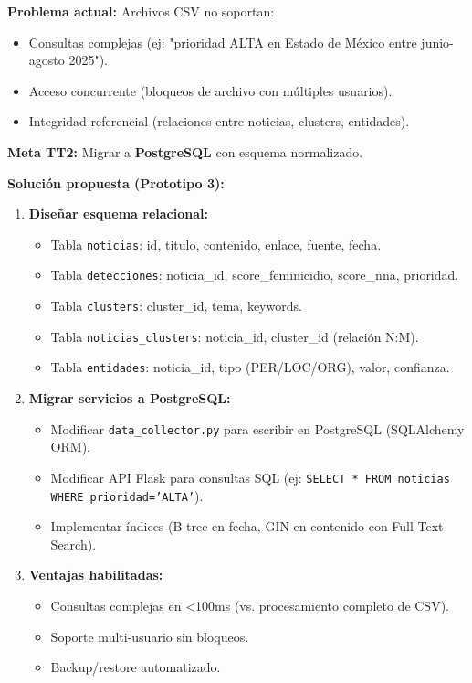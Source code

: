 \textbf{Problema actual:} Archivos CSV no soportan:
\begin{itemize}
    \item Consultas complejas (ej: "prioridad ALTA en Estado de México entre junio-agosto 2025").
    \item Acceso concurrente (bloqueos de archivo con múltiples usuarios).
    \item Integridad referencial (relaciones entre noticias, clusters, entidades).
\end{itemize}

\textbf{Meta TT2:} Migrar a \textbf{PostgreSQL} con esquema normalizado.

\textbf{Solución propuesta (Prototipo 3):}
\begin{enumerate}
    \item \textbf{Diseñar esquema relacional:}
    \begin{itemize}
        \item Tabla \texttt{noticias}: id, titulo, contenido, enlace, fuente, fecha.
        \item Tabla \texttt{detecciones}: noticia\_id, score\_feminicidio, score\_nna, prioridad.
        \item Tabla \texttt{clusters}: cluster\_id, tema, keywords.
        \item Tabla \texttt{noticias\_clusters}: noticia\_id, cluster\_id (relación N:M).
        \item Tabla \texttt{entidades}: noticia\_id, tipo (PER/LOC/ORG), valor, confianza.
    \end{itemize}
    
    \item \textbf{Migrar servicios a PostgreSQL:}
    \begin{itemize}
        \item Modificar \texttt{data\_collector.py} para escribir en PostgreSQL (SQLAlchemy ORM).
        \item Modificar API Flask para consultas SQL (ej: \texttt{SELECT * FROM noticias WHERE prioridad='ALTA'}).
        \item Implementar índices (B-tree en fecha, GIN en contenido con Full-Text Search).
    \end{itemize}
    
    \item \textbf{Ventajas habilitadas:}
    \begin{itemize}
        \item Consultas complejas en <100ms (vs. procesamiento completo de CSV).
        \item Soporte multi-usuario sin bloqueos.
        \item Backup/restore automatizado.
    \end{itemize}
\end{enumerate}

